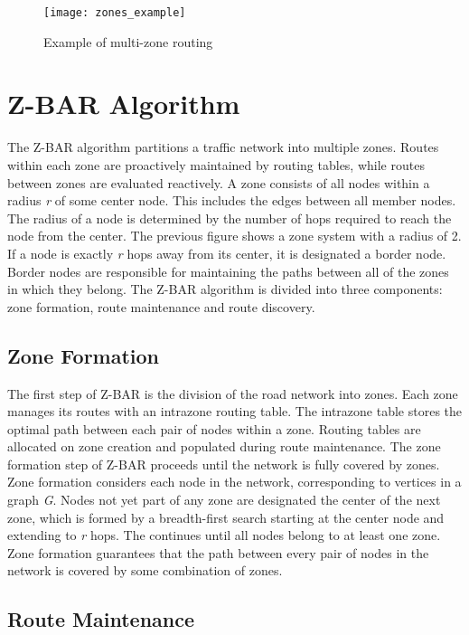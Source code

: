 \documentclass[conference]{IEEEtran}
\begin{document}
\begin{figure}[h]
\caption{Example of multi-zone routing}
\centering
\texttt{[image: zones\_example]}
\end{figure}

\section{Z-BAR Algorithm}

The Z-BAR algorithm partitions a traffic network into multiple zones. Routes within each zone are proactively maintained by routing tables, while routes between zones are evaluated reactively. A zone consists of all nodes within a radius \textit{r} of some center node. This includes the edges between all member nodes. The radius of a node is determined by the number of hops required to reach the node from the center. The previous figure shows a zone system with a radius of 2. If a node is exactly \textit{r} hops away from its center, it is designated a border node. Border nodes are responsible for maintaining the paths between all of the zones in which they belong. The Z-BAR algorithm is divided into three components: zone formation, route maintenance and route discovery.

\subsection{Zone Formation}

The first step of Z-BAR is the division of the road network into zones. Each zone manages its routes with an intrazone routing table. The intrazone table stores the optimal path between each pair of nodes within a zone. Routing tables are allocated on zone creation and populated during route maintenance. The zone formation step of Z-BAR proceeds until the network is fully covered by zones. Zone formation considers each node in the network, corresponding to vertices in a graph \textit{G}. Nodes not yet part of any zone are designated the center of the next zone, which is formed by a breadth-first search starting at the center node and extending to \textit{r} hops. The continues until all nodes belong to at least one zone. Zone formation guarantees that the path between every pair of nodes in the network is covered by some combination of zones.

\subsection{Route Maintenance} %
\end{document}
